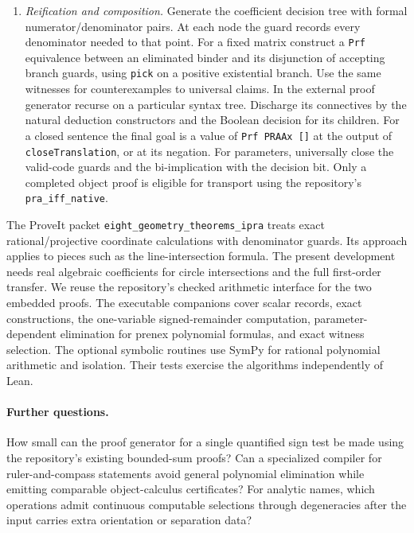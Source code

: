 \begin{enumerate}
degree-clocked loop. Define \texttt{query}, the sign counts
in~\eqref{eq:counts}, and the two tail signs. Prove~\eqref{eq:query}
by a finite sweep over the ordered roots from the preceding step.
The invariant is the integer equality between variation loss and root
contributions through the current cell. For a specialized polynomial
list, prove equivalence between each attainable sign condition and its
computed positive count or tail flag. Define \texttt{pick} from the actual
ordered point/interval samples to return a concrete satisfying code.
\item \emph{Reification and composition.} Generate the coefficient
decision tree with formal numerator/denominator pairs. At each node the
guard records every denominator needed to that point. For a fixed
matrix construct a \texttt{Prf} equivalence between an eliminated binder
and its disjunction of accepting branch guards, using \texttt{pick} on
a positive existential branch. Use the same witnesses for counterexamples
to universal claims. In the external proof generator recurse on a
particular syntax tree. Discharge its connectives by the natural
deduction constructors and the Boolean decision for its children.
For a closed sentence the final goal is a value of \texttt{Prf PRAAx []}
at the output of \texttt{closeTranslation}, or at its negation.
For parameters, universally close the valid-code guards and the
bi-implication with the decision bit. Only a completed object proof
is eligible for transport using the repository's \texttt{pra\_iff\_native}.
\end{enumerate}

The ProveIt packet \texttt{eight\_geometry\_theorems\_ipra} treats exact
rational/projective coordinate calculations with denominator guards.
Its approach applies to pieces such as the line-intersection formula.
The present development needs real algebraic coefficients for circle
intersections and the full first-order transfer. We reuse the repository's
checked arithmetic interface for the two embedded proofs.
The executable companions cover scalar records, exact constructions, the
one-variable signed-remainder computation, parameter-dependent elimination
for prenex polynomial formulas, and exact witness selection. The
optional symbolic routines use SymPy for rational polynomial arithmetic
and isolation. Their tests exercise the algorithms independently of Lean.

\paragraph{Further questions.}
How small can the proof generator for a single quantified sign test be
made using the repository's existing bounded-sum proofs? Can a
specialized compiler for ruler-and-compass statements avoid general
polynomial elimination while emitting comparable object-calculus
certificates? For analytic names, which operations admit continuous
computable selections through degeneracies after the input carries extra
orientation or separation data?
